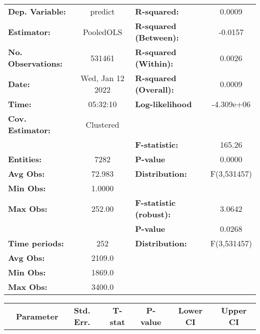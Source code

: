 \begin{center}
\begin{tabular}{lclc}
\toprule
\textbf{Dep. Variable:}    &      predict       & \textbf{  R-squared:         }   &      0.0009      \\
\textbf{Estimator:}        &     PooledOLS      & \textbf{  R-squared (Between):}  &     -0.0157      \\
\textbf{No. Observations:} &       531461       & \textbf{  R-squared (Within):}   &      0.0026      \\
\textbf{Date:}             &  Wed, Jan 12 2022  & \textbf{  R-squared (Overall):}  &      0.0009      \\
\textbf{Time:}             &      05:32:10      & \textbf{  Log-likelihood     }   &    -4.309e+06    \\
\textbf{Cov. Estimator:}   &     Clustered      & \textbf{                     }   &                  \\
\textbf{}                  &                    & \textbf{  F-statistic:       }   &      165.26      \\
\textbf{Entities:}         &        7282        & \textbf{  P-value            }   &      0.0000      \\
\textbf{Avg Obs:}          &       72.983       & \textbf{  Distribution:      }   &   F(3,531457)    \\
\textbf{Min Obs:}          &       1.0000       & \textbf{                     }   &                  \\
\textbf{Max Obs:}          &       252.00       & \textbf{  F-statistic (robust):} &      3.0642      \\
\textbf{}                  &                    & \textbf{  P-value            }   &      0.0268      \\
\textbf{Time periods:}     &        252         & \textbf{  Distribution:      }   &   F(3,531457)    \\
\textbf{Avg Obs:}          &       2109.0       & \textbf{                     }   &                  \\
\textbf{Min Obs:}          &       1869.0       & \textbf{                     }   &                  \\
\textbf{Max Obs:}          &       3400.0       & \textbf{                     }   &                  \\
\bottomrule
\end{tabular}
\begin{tabular}{lcccccc}
                & \textbf{Parameter} & \textbf{Std. Err.} & \textbf{T-stat} & \textbf{P-value} & \textbf{Lower CI} & \textbf{Upper CI}  \\

\end{tabular}
\end{center}
